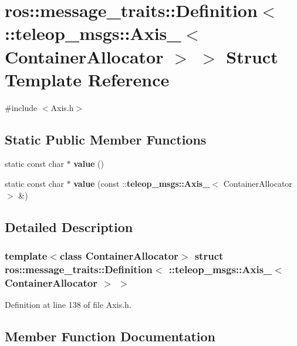\section{ros::message\_\-traits::Definition$<$ ::teleop\_\-msgs::Axis\_\-$<$ ContainerAllocator $>$ $>$ Struct Template Reference}
\label{structros_1_1message__traits_1_1Definition_3_01_1_1teleop__msgs_1_1Axis___3_01ContainerAllocator_01_4_01_4}


{\ttfamily \#include $<$Axis.h$>$}

\subsection*{Static Public Member Functions}
\begin{DoxyCompactItemize}
\item 
static const char $\ast$ {\bf value} ()
\item 
static const char $\ast$ {\bf value} (const ::{\bf teleop\_\-msgs::Axis\_\-}$<$ ContainerAllocator $>$ \&)
\end{DoxyCompactItemize}


\subsection{Detailed Description}
\subsubsection*{template$<$class ContainerAllocator$>$ struct ros::message\_\-traits::Definition$<$ ::teleop\_\-msgs::Axis\_\-$<$ ContainerAllocator $>$ $>$}



Definition at line 138 of file Axis.h.



\subsection{Member Function Documentation}
